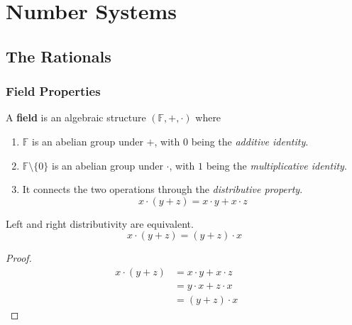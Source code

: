 \section{Number Systems} 

\subsection{The Rationals}

  \subsubsection{Field Properties}  

    \begin{definition}[Field]
      A \textbf{field} is an algebraic structure $(\mathbb{F}, +, \cdot)$ where 
      \begin{enumerate}
        \item $\mathbb{F}$ is an abelian group under $+$, with $0$ being the \textit{additive identity}. 
        \item $\mathbb{F} \setminus \{0\}$ is an abelian group under $\cdot$, with $1$ being the \textit{multiplicative identity}. 
        \item It connects the two operations through the \textit{distributive property}.
        \begin{equation}
          x \cdot (y + z) = x \cdot y + x \cdot z
        \end{equation}
      \end{enumerate}
    \end{definition} 

    \begin{lemma}[Left = Right Distributivity]
      Left and right distributivity are equivalent. 
      \begin{equation}
        x \cdot (y + z) = (y + z) \cdot x
      \end{equation}
    \end{lemma} 
    \begin{proof}
      \begin{align}
        x \cdot (y + z) & = x \cdot y + x \cdot z && \tag{Distributive} \\
                        & = y \cdot x + z \cdot x && \tag{Commutative} \\
                        & = (y + z) \cdot x && \tag{Distributive} 
      \end{align}
    \end{proof} 

